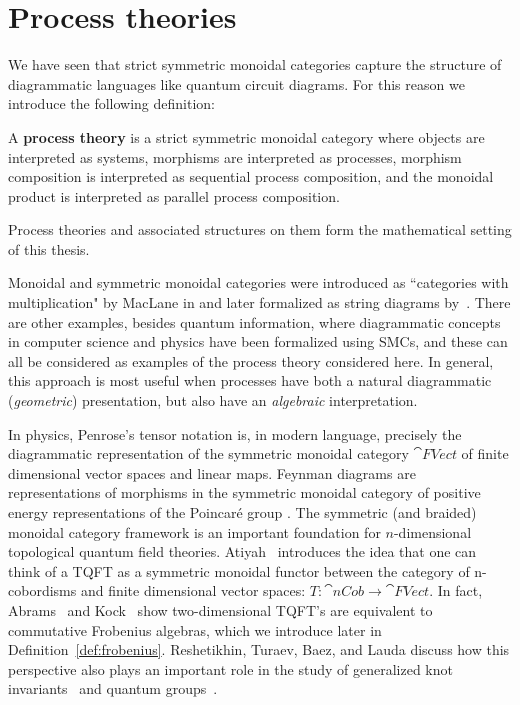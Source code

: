 \section{Process theories}
\label{sec:PTs}

We have seen that strict symmetric monoidal categories capture the structure of  diagrammatic languages like quantum circuit diagrams. For this reason we introduce the following definition:

\begin{defn}
A \textbf{process theory} is a strict symmetric monoidal category where objects are interpreted as systems, morphisms are interpreted as processes, morphism composition is interpreted as sequential process composition, and the monoidal product is interpreted as parallel process composition.
\end{defn}

\noindent Process theories and associated structures on them form the mathematical setting of this thesis.

Monoidal and symmetric monoidal categories were introduced as ``categories with multiplication" by MacLane in \cite{maclane1963natural} and later formalized as string diagrams by~\cite{joyal1991geometry}. There are other examples, besides quantum information, where diagrammatic concepts in computer science and physics have been formalized using SMCs, and these can all be considered as examples of the process theory considered here.  In general, this approach is most useful when processes have both a natural diagrammatic (\emph{geometric}) presentation, but also have an \emph{algebraic} interpretation.

In physics, Penrose's tensor notation \cite{penrose1971applications} is, in modern language, precisely the diagrammatic representation of the symmetric monoidal category $\cat{FVect}$ of finite dimensional vector spaces and linear maps. Feynman diagrams are representations of morphisms in the symmetric monoidal category of positive energy representations of the Poincar\'{e} group \cite{baez2009prehistory}. The symmetric (and braided) monoidal category framework is an important foundation for $n$-dimensional topological quantum field theories. Atiyah~\cite{atiyah1988topological} introduces the idea that one can think of a TQFT as a symmetric monoidal functor between the category of n-cobordisms and finite dimensional vector spaces: $T:\cat{nCob}\to \cat{FVect}$. In fact, Abrams~\cite{abrams1996two} and Kock~\cite{kock2004frobenius} show two-dimensional TQFT's are equivalent to commutative Frobenius algebras, which we introduce later in Definition~\ref{def:frobenius}. Reshetikhin, Turaev, Baez, and Lauda discuss how this perspective also plays an important role in the study of generalized knot invariants~\cite{reshetikhin1990ribbon} and quantum groups~\cite{baez2009prehistory}. 

